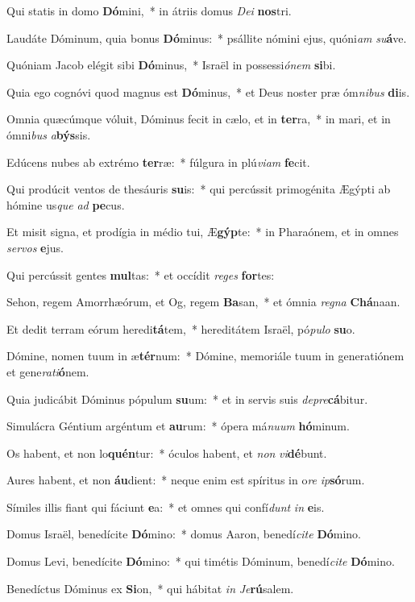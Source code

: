 \item Qui statis in domo \textbf{Dó}mini,~* in átriis domus \textit{De}\textit{i} \textbf{nos}tri.
\item Laudáte Dóminum, quia bonus \textbf{Dó}minus:~* psállite nómini ejus, quóni\textit{am} \textit{su}\textbf{á}ve.
\item Quóniam Jacob elégit sibi \textbf{Dó}minus,~* Israël in possessi\textit{ó}\textit{nem} \textbf{si}bi.
\item Quia ego cognóvi quod magnus est \textbf{Dó}minus,~* et Deus noster præ óm\textit{ni}\textit{bus} \textbf{di}is.
\item Omnia quæcúmque vóluit, Dóminus fecit in cælo, et in \textbf{ter}ra,~* in mari, et in ómni\textit{bus} \textit{a}\textbf{býs}sis.
\item Edúcens nubes ab extrémo \textbf{ter}ræ:~* fúlgura in plú\textit{vi}\textit{am} \textbf{fe}cit.
\item Qui prodúcit ventos de thesáuris \textbf{su}is:~* qui percússit primogénita Ægýpti ab hómine us\textit{que} \textit{ad} \textbf{pe}cus.
\item Et misit signa, et prodígia in médio tui, Æ\textbf{gýp}te:~* in Pharaónem, et in omnes \textit{ser}\textit{vos} \textbf{e}jus.
\item Qui percússit gentes \textbf{mul}tas:~* et occídit \textit{re}\textit{ges} \textbf{for}tes:
\item Sehon, regem Amorrhæórum, et Og, regem \textbf{Ba}san,~* et ómnia \textit{re}\textit{gna} \textbf{Chá}naan.
\item Et dedit terram eórum heredi\textbf{tá}tem,~* hereditátem Israël, pó\textit{pu}\textit{lo} \textbf{su}o.
\item Dómine, nomen tuum in æ\textbf{tér}num:~* Dómine, memoriále tuum in generatiónem et gene\textit{ra}\textit{ti}\textbf{ó}nem.
\item Quia judicábit Dóminus pópulum \textbf{su}um:~* et in servis suis \textit{de}\textit{pre}\textbf{cá}bitur.
\item Simulácra Géntium argéntum et \textbf{au}rum:~* ópera má\textit{nu}\textit{um} \textbf{hó}minum.
\item Os habent, et non lo\textbf{quén}tur:~* óculos habent, et \textit{non} \textit{vi}\textbf{dé}bunt.
\item Aures habent, et non \textbf{áu}dient:~* neque enim est spíritus in o\textit{re} \textit{ip}\textbf{só}rum.
\item Símiles illis fiant qui fáciunt \textbf{e}a:~* et omnes qui confí\textit{dunt} \textit{in} \textbf{e}is.
\item Domus Israël, benedícite \textbf{Dó}mino:~* domus Aaron, benedí\textit{ci}\textit{te} \textbf{Dó}mino.
\item Domus Levi, benedícite \textbf{Dó}mino:~* qui timétis Dóminum, benedí\textit{ci}\textit{te} \textbf{Dó}mino.
\item Benedíctus Dóminus ex \textbf{Si}on,~* qui hábitat \textit{in} \textit{Je}\textbf{rú}salem.
